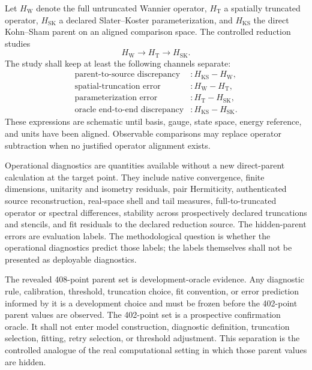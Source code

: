 \documentclass[11pt]{article}
\begin{document}
Let $H_{\mathrm{W}}$ denote the full untruncated Wannier operator,
$H_{\mathrm{T}}$ a spatially truncated operator, $H_{\mathrm{SK}}$ a declared
Slater--Koster parameterization, and $H_{\mathrm{KS}}$ the direct Kohn--Sham parent on
an aligned comparison space.  The controlled reduction studies
\begin{equation}
  H_{\mathrm{W}}\longrightarrow H_{\mathrm{T}}
  \longrightarrow H_{\mathrm{SK}}.
\end{equation}
The study shall keep at least the following channels separate:
\begin{align}
  \text{parent-to-source discrepancy} &: H_{\mathrm{KS}}-H_{\mathrm{W}},\\
  \text{spatial-truncation error} &: H_{\mathrm{W}}-H_{\mathrm{T}},\\
  \text{parameterization error} &: H_{\mathrm{T}}-H_{\mathrm{SK}},\\
  \text{oracle end-to-end discrepancy} &: H_{\mathrm{KS}}-H_{\mathrm{SK}}.
\end{align}
These expressions are schematic until basis, gauge, state space, energy reference, and
units have been aligned.  Observable comparisons may replace operator subtraction when
no justified operator alignment exists.

Operational diagnostics are quantities available without a new direct-parent
calculation at the target point.  They include native convergence, finite dimensions,
unitarity and isometry residuals, pair Hermiticity, authenticated source reconstruction,
real-space shell and tail measures, full-to-truncated operator or spectral differences,
stability across prospectively declared truncations and stencils, and fit residuals to
the declared reduction source.  The hidden-parent errors are evaluation labels.  The
methodological question is whether the operational diagnostics predict those labels;
the labels themselves shall not be presented as deployable diagnostics.

The revealed 408-point parent set is development-oracle evidence.  Any diagnostic rule,
calibration, threshold, truncation choice, fit convention, or error prediction informed
by it is a development choice and must be frozen before the 402-point parent values are
observed.  The 402-point set is a prospective confirmation oracle.  It shall not enter
model construction, diagnostic definition, truncation selection, fitting, retry
selection, or threshold adjustment.  This separation is the controlled analogue of the
real computational setting in which those parent values are hidden.
\end{document}
